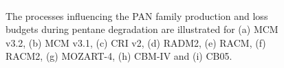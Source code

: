 \begin{figure}
    \begin{center}
        \includegraphics[width=\textwidth]{img/pentane_pan_budgets}
    \end{center}
    \caption{The processes influencing the PAN family production and loss budgets during pentane degradation are illustrated for (a) MCM v3.2, (b) MCM v3.1, (c) CRI v2, (d) RADM2, (e) RACM, (f) RACM2, (g) MOZART-4, (h) CBM-IV and (i) CB05.}
    \label{f:pentane_PAN}
\end{figure}

